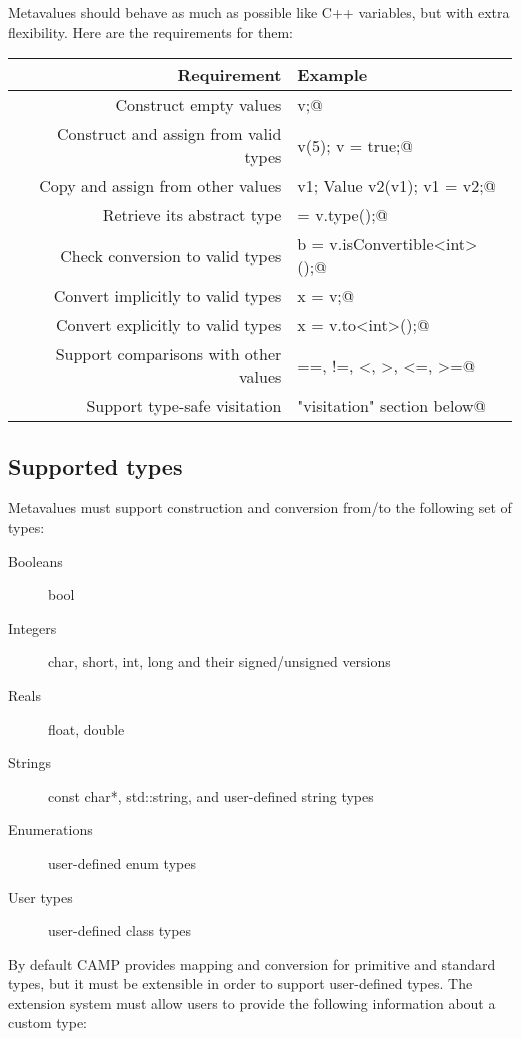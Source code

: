 \documentclass[a4paper, twoside]{report}
\begin{document}
	Metavalues should behave as much as possible like C++ variables, but with extra flexibility.
	Here are the requirements for them:

	\begin{tabular}{r|l}
		\textbf{Requirement}									& \textbf{Example}												\\
		\hline
		Construct empty values 								& \verb@Value v;@    											\\
		Construct and assign from valid types	& \verb@Value v(5); v = true;@ 						\\
		Copy and assign from other values 		& \verb@Value v1; Value v2(v1); v1 = v2;@ \\
		Retrieve its abstract type 						& \verb@type = v.type();@ 							\\
		Check conversion to valid types 			& \verb@bool b = v.isConvertible<int>();@ \\
		Convert implicitly to valid types 		& \verb@int x = v;@ 											\\
		Convert explicitly to valid types 		& \verb@int x = v.to<int>();@ 						\\
		Support comparisons with other values	& \verb@ ==, !=, <, >, <=, >=@ 						\\
		Support type-safe visitation 					& \verb@see "visitation" section below@ 	\\
	\end{tabular}

\subsection{Supported types}
\label{sec:metavalue-types}

	Metavalues must support construction and conversion from/to the following set of types:

	\begin{description}
		\item[Booleans] bool
		\item[Integers] char, short, int, long and their signed/unsigned versions
		\item[Reals] float, double
		\item[Strings] const char*, std::string, and user-defined string types
		\item[Enumerations] user-defined enum types
		\item[User types] user-defined class types
	\end {description}
	
	By default CAMP provides mapping and conversion for primitive and standard types, but
	it must be extensible in order to support user-defined types. The extension system must
	allow users to provide the following information	about a custom type:
	
\end{document}
